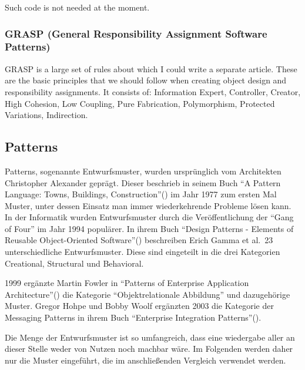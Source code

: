 Such code is not needed at the moment.
\subsubsection{GRASP (General Responsibility Assignment Software Patterns)}
GRASP is a large set of rules about which I could write a separate article.
These are the basic principles that we should follow when creating object design and responsibility assignments.
It consists of: Information Expert, Controller, Creator, High Cohesion, Low Coupling, Pure Fabrication, Polymorphism, Protected Variations, Indirection.

\subsection{Patterns}
Patterns, sogenannte Entwurfsmuster, wurden ursprünglich vom Architekten Christopher Alexander geprägt.
Dieser beschrieb in seinem Buch \enquote{A Pattern Language: Towns, Buildings, Construction}(\cite{a-pattern-language}) im Jahr 1977 zum ersten Mal Muster, unter dessen Einsatz man immer wiederkehrende Probleme lösen kann.
In der Informatik wurden Entwurfsmuster durch die Veröffentlichung der \enquote{Gang of Four} im Jahr 1994 populärer.
In ihrem Buch \enquote{Design Patterns - Elements of Reusable Object-Oriented Software}(\cite{gamma-design-patterns}) beschreiben Erich Gamma et al.\ 23 unterschiedliche Entwurfsmuster.
Diese sind eingeteilt in die drei Kategorien Creational, Structural und Behavioral.

1999 ergänzte Martin Fowler in \enquote{Patterns of Enterprise Application Architecture}(\cite{patterns-of-enterprise-application-architecture}) die Kategorie \enquote{Objektrelationale Abbildung} und dazugehörige Muster.
Gregor Hohpe und Bobby Woolf ergänzten 2003 die Kategorie der Messaging Patterns in ihrem Buch \enquote{Enterprise Integration Patterns}(\cite{enterprise-integration-patterns}).

Die Menge der Entwurfsmuster ist so umfangreich, dass eine wiedergabe aller an dieser Stelle weder von Nutzen noch machbar wäre.
Im Folgenden werden daher nur die Muster eingeführt, die im anschließenden Vergleich verwendet werden.
